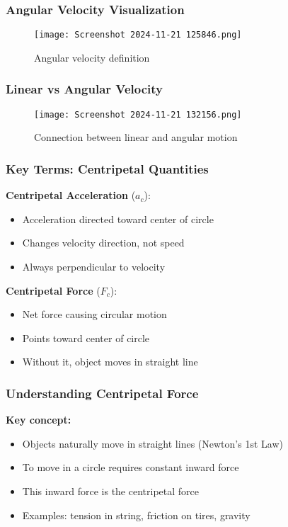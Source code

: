 \documentclass{beamer}
\begin{document}
\begin{frame}
\frametitle{Angular Velocity Visualization}
\begin{figure}[H]
    \centering
    \texttt{[image: Screenshot 2024-11-21 125846.png]}
    \caption{Angular velocity definition}
\end{figure}
\end{frame}

\begin{frame}
\frametitle{Linear vs Angular Velocity}
\begin{figure}
    \centering
    \texttt{[image: Screenshot 2024-11-21 132156.png]}
    \caption{Connection between linear and angular motion}
\end{figure}
\end{frame}

\begin{frame}
\frametitle{Key Terms: Centripetal Quantities}
\pause
\textbf{Centripetal Acceleration} ($a_c$):
\begin{itemize}
    \item Acceleration directed toward center of circle
    \pause
    \item Changes velocity direction, not speed
    \pause
    \item Always perpendicular to velocity
\end{itemize}
\pause

\textbf{Centripetal Force} ($F_c$):
\begin{itemize}
    \item Net force causing circular motion
    \pause
    \item Points toward center of circle
    \pause
    \item Without it, object moves in straight line
\end{itemize}
\end{frame}

\begin{frame}
\frametitle{Understanding Centripetal Force}
\textbf{Key concept:}
\pause
\begin{itemize}
    \item Objects naturally move in straight lines (Newton's 1st Law)
    \pause
    \item To move in a circle requires constant inward force
    \pause
    \item This inward force is the centripetal force
    \pause
    \item Examples: tension in string, friction on tires, gravity
\end{itemize}
\end{frame}
\end{document}
